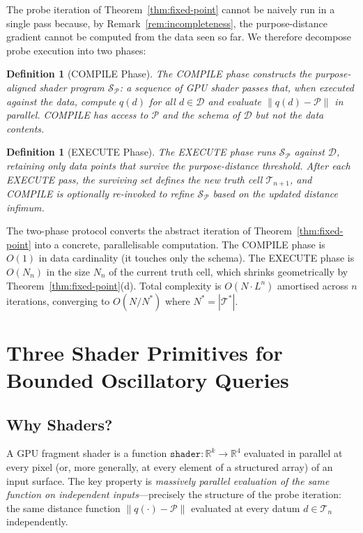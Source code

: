\documentclass[10pt,twocolumn]{article}
\newtheorem{definition}[theorem]{Definition}
\newcommand{\R}{\mathbb{R}}
\newcommand{\TruthCell}{\mathcal{T}}
\newcommand{\PurposePoint}{\mathcal{P}}
\newcommand{\DataSpace}{\mathcal{D}}
\begin{document}
The probe iteration of Theorem~\ref{thm:fixed-point} cannot be
naively run in a single pass because, by Remark~\ref{rem:incompleteness},
the purpose-distance gradient cannot be computed from the data seen so far.
We therefore decompose probe execution into two phases:

\begin{definition}[COMPILE Phase]
The COMPILE phase constructs the \emph{purpose-aligned shader program}
$\mathcal{S}_\PurposePoint$: a sequence of GPU shader passes that,
when executed against the data, compute $q(d)$ for all $d \in \DataSpace$
and evaluate $\|q(d) - \PurposePoint\|$ in parallel.
COMPILE has access to $\PurposePoint$ and the schema of $\DataSpace$
but not the data contents.
\end{definition}

\begin{definition}[EXECUTE Phase]
The EXECUTE phase runs $\mathcal{S}_\PurposePoint$ against $\DataSpace$,
retaining only data points that survive the purpose-distance threshold.
After each EXECUTE pass, the surviving set defines the new truth cell $\TruthCell_{n+1}$,
and COMPILE is optionally re-invoked to refine $\mathcal{S}_\PurposePoint$
based on the updated distance infimum.
\end{definition}

The two-phase protocol converts the abstract iteration of Theorem~\ref{thm:fixed-point}
into a concrete, parallelisable computation.
The COMPILE phase is $O(1)$ in data cardinality (it touches only the schema).
The EXECUTE phase is $O(N_n)$ in the size $N_n$ of the current truth cell,
which shrinks geometrically by Theorem~\ref{thm:fixed-point}(d).
Total complexity is $O(N \cdot L^n)$ amortised across $n$ iterations,
converging to $O(N/N^*)$ where $N^* = |\TruthCell^*|$.

\section{Three Shader Primitives for Bounded Oscillatory Queries}
\label{sec:shader}

\subsection{Why Shaders?}

A GPU fragment shader is a function $\mathtt{shader} : \R^k \to \R^4$
evaluated in parallel at every pixel (or, more generally, at every element
of a structured array) of an input surface.
The key property is \emph{massively parallel evaluation of the same function
on independent inputs}---precisely the structure of the probe iteration:
the same distance function $\|q(\cdot) - \PurposePoint\|$ evaluated at every
datum $d \in \TruthCell_n$ independently.
\end{document}
